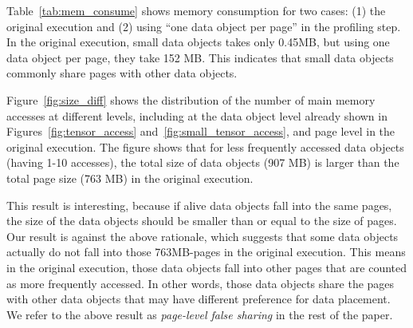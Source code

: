 
\textcolor{dong2}{Table~\ref{tab:mem_consume} shows memory consumption for two cases: (1) the original execution and (2) using ``one data object per page'' in the profiling step. In the original execution, small data objects takes only 0.45MB, but using one data object per page, they take 152 MB.} This indicates that small data objects commonly share pages with other data objects. 

Figure~\ref{fig:size_diff} shows the distribution of the number of main memory accesses at different levels, including at the data object level already shown in Figures~\ref{fig:tensor_access} and~\ref{fig:small_tensor_access}, and page level in the original execution. The figure shows that for less frequently accessed data objects (having 1-10 accesses), the total size of data objects (907 MB) is larger than the total page size (763 MB) in \textcolor{dong2}{the original execution}. 

This result is interesting, because if alive data objects fall into the same pages, the size of the data objects should be smaller than or equal to the size of pages.  
Our result is against the above rationale, which suggests that some data objects actually do not fall into those 763MB-pages \textcolor{dong2}{in the original execution}. This means \textcolor{dong2}{in the original execution}, those data objects fall into other pages that are counted as more frequently accessed. In other words, those data objects share the pages with other data objects that may have different preference for data placement. We refer to the above result as \textit{page-level false sharing} in the rest of the paper. 









